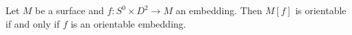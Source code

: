 Let $M$ be a surface and $f: S^0 \times D^2 \to M$ an embedding. Then $M[f]$ is orientable if and only if $f$ is an orientable embedding.
